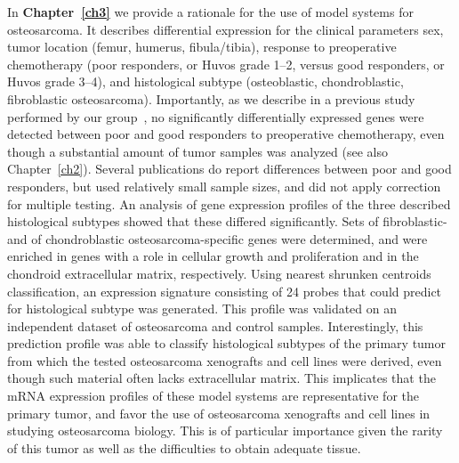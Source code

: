 In {\bf Chapter~\ref{ch3}} we provide a rationale for the use of model systems for osteosarcoma. It describes differential expression for the clinical parameters sex, tumor location (femur, humerus, fibula/tibia), response to preoperative chemotherapy (poor responders, or Huvos grade 1--2, versus good responders, or Huvos grade 3--4), and histological subtype (osteoblastic, chondroblastic, fibroblastic osteosarcoma). Importantly, as we describe in a previous study performed by our group~\cite{cleton2009profiling}, no significantly differentially expressed genes were detected between poor and good responders to preoperative chemotherapy, even though a substantial amount of tumor samples was analyzed (see also Chapter~\ref{ch2}). Several publications do report differences between poor and good responders, but used relatively small sample sizes, and did not apply correction for multiple testing. An analysis of gene expression profiles of the three described histological subtypes showed that these differed significantly. Sets of fibroblastic- and of chondroblastic osteosarcoma\hyp{}specific genes were determined, and were enriched in genes with a role in cellular growth and proliferation and in the chondroid extracellular matrix, respectively. Using nearest shrunken centroids classification, an expression signature consisting of 24 probes that could predict for histological subtype was generated. This profile was validated on an independent dataset of osteosarcoma and control samples. Interestingly, this prediction profile was able to classify histological subtypes of the primary tumor from which the tested osteosarcoma xenografts and cell lines were derived, even though such material often lacks extracellular matrix. This implicates that the mRNA expression profiles of these model systems are representative for the primary tumor, and favor the use of osteosarcoma xenografts and cell lines in studying osteosarcoma biology. This is of particular importance given the rarity of this tumor as well as the difficulties to obtain adequate tissue.

%
